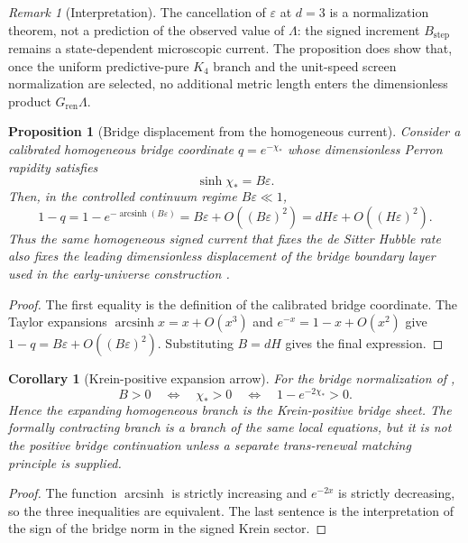 \documentclass[11pt]{article}
\newtheorem{proposition}[theorem]{Proposition}
\newtheorem{corollary}[theorem]{Corollary}
\theoremstyle{definition}
\theoremstyle{remark}
\newtheorem{remark}[theorem]{Remark}
\newcommand{\eps}{\varepsilon}
\newcommand{\Gren}{G_{\mathrm{ren}}}
\newcommand{\Bstep}{B_{\mathrm{step}}}
\begin{document}
\begin{remark}[Interpretation]
The cancellation of \(\eps\) at \(d=3\) is a normalization theorem, not a
prediction of the observed value of \(\Lambda\): the signed increment
\(\Bstep\) remains a state-dependent microscopic current.  The proposition
does show that, once the uniform predictive-pure \(K_4\) branch and the
unit-speed screen normalization are selected, no additional metric length
enters the dimensionless product \(\Gren\Lambda\).
\end{remark}


\begin{proposition}[Bridge displacement from the homogeneous current]
\label{prop:bridge-displacement}
Consider a calibrated homogeneous bridge coordinate $q=e^{-\chi_*}$ whose
dimensionless Perron rapidity satisfies
\[
        \sinh\chi_*=B\eps .
\]
Then, in the controlled continuum regime $B\eps\ll1$,
\[
        1-q=1-e^{-\operatorname{arcsinh}(B\eps)}
        =B\eps+O((B\eps)^2)
        =dH\eps+O((H\eps)^2).
\]
Thus the same homogeneous signed current that fixes the de Sitter Hubble rate
also fixes the leading dimensionless displacement of the bridge boundary layer
used in the early-universe construction \cite{PelissierBridge,PelissierInflationBaryogenesisArxiv}.
\end{proposition}

\begin{proof}
The first equality is the definition of the calibrated bridge coordinate.  The
Taylor expansions $\operatorname{arcsinh}x=x+O(x^3)$ and $e^{-x}=1-x+O(x^2)$ give
$1-q=B\eps+O((B\eps)^2)$.  Substituting $B=dH$ gives the final expression.
\end{proof}

\begin{corollary}[Krein-positive expansion arrow]
\label{cor:krein-positive-expansion-arrow}
For the bridge normalization of ,
\[
        B>0 \quad\Longleftrightarrow\quad
        \chi_*>0 \quad\Longleftrightarrow\quad
        1-e^{-2\chi_*}>0 .
\]
Hence the expanding homogeneous branch is the Krein-positive bridge sheet.  The
formally contracting branch is a branch of the same local equations, but it is
not the positive bridge continuation unless a separate trans-renewal matching
principle is supplied.
\end{corollary}

\begin{proof}
The function $\operatorname{arcsinh}$ is strictly increasing and $e^{-2x}$ is
strictly decreasing, so the three inequalities are equivalent.  The last
sentence is the interpretation of the sign of the bridge norm in the signed
Krein sector.
\end{proof}
\end{document}
